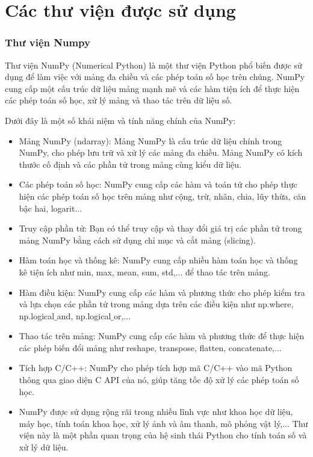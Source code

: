 \section{Các thư viện được sử dụng}

\subsubsection{Thư viện Numpy}

Thư viện NumPy (Numerical Python) là một thư viện Python phổ biến được sử dụng để làm việc với mảng đa chiều và các phép toán số học trên chúng. NumPy cung cấp một cấu trúc dữ liệu mảng mạnh mẽ và các hàm tiện ích để thực hiện các phép toán số học, xử lý mảng và thao tác trên dữ liệu số.

Dưới đây là một số khái niệm và tính năng chính của NumPy:

\begin{itemize}
	\item Mảng NumPy (ndarray): Mảng NumPy là cấu trúc dữ liệu chính trong NumPy, cho phép lưu trữ và xử lý các mảng đa chiều. Mảng NumPy có kích thước cố định và các phần tử trong mảng cùng kiểu dữ liệu.
	
	\item Các phép toán số học: NumPy cung cấp các hàm và toán tử cho phép thực hiện các phép toán số học trên mảng như cộng, trừ, nhân, chia, lũy thừa, căn bậc hai, logarit...
	
	\item Truy cập phần tử: Bạn có thể truy cập và thay đổi giá trị các phần tử trong mảng NumPy bằng cách sử dụng chỉ mục và cắt mảng (slicing).
	
	\item Hàm toán học và thống kê: NumPy cung cấp nhiều hàm toán học và thống kê tiện ích như min, max, mean, sum, std,... để thao tác trên mảng.
	
	\item Hàm điều kiện: NumPy cung cấp các hàm và phương thức cho phép kiểm tra và lựa chọn các phần tử trong mảng dựa trên các điều kiện như np.where, np.logical$\_$and, np.logical$\_$or,...
	
	\item Thao tác trên mảng: NumPy cung cấp các hàm và phương thức để thực hiện các phép biến đổi mảng như reshape, transpose, flatten, concatenate,...
	
	\item Tích hợp C/C++: NumPy cho phép tích hợp mã C/C++ vào mã Python thông qua giao diện C API của nó, giúp tăng tốc độ xử lý các phép toán số học.
	
	\item NumPy được sử dụng rộng rãi trong nhiều lĩnh vực như khoa học dữ liệu, máy học, tính toán khoa học, xử lý ảnh và âm thanh, mô phỏng vật lý,... Thư viện này là một phần quan trọng của hệ sinh thái Python cho tính toán số và xử lý dữ liệu.
\end{itemize}


